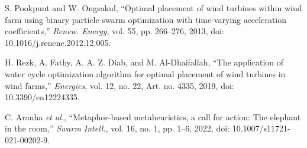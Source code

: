 
S. Pookpunt and W. Ongsakul, ``Optimal placement of wind turbines within wind farm using binary particle swarm optimization with time-varying acceleration coefficients,'' \textit{Renew. Energy}, vol. 55, pp. 266--276, 2013, doi: 10.1016/j.renene.2012.12.005.

H. Rezk, A. Fathy, A. A. Z. Diab, and M. Al-Dhaifallah, ``The application of water cycle optimization algorithm for optimal placement of wind turbines in wind farms,'' \textit{Energies}, vol. 12, no. 22, Art. no. 4335, 2019, doi: 10.3390/en12224335.

C. Aranha \textit{et al.}, ``Metaphor-based metaheuristics, a call for action: The elephant in the room,'' \textit{Swarm Intell.}, vol. 16, no. 1, pp. 1--6, 2022, doi: 10.1007/s11721-021-00202-9.


